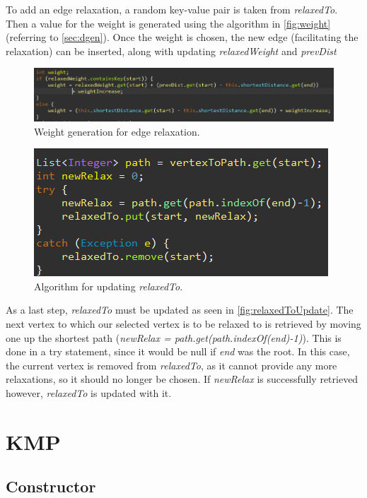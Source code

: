 \documentclass{l4proj}
\begin{document}
To add an edge relaxation, a random key-value pair is taken from \emph{relaxedTo}. Then a value for the weight is generated using the algorithm in \autoref{fig:weight} (referring to \autoref{sec:dgen}). Once the weight is chosen, the new edge (facilitating the relaxation) can be inserted, along with updating \emph{relaxedWeight} and \emph{prevDist}

\begin{figure}
    \centering
    \includegraphics[width=0.99\linewidth]{images/weight.png}    

    \caption{Weight generation for edge relaxation.}
    \label{fig:weight} 
\end{figure}

\begin{figure}
    \centering
    \includegraphics[width=0.5\linewidth]{images/relaxedToUpdate.png}    

    \caption{Algorithm for updating \emph{relaxedTo}.}
    \label{fig:relaxedToUpdate} 
\end{figure}

As a last step, \emph{relaxedTo} must be updated as seen in \autoref{fig:relaxedToUpdate}. The next vertex to which our selected vertex is to be relaxed to is retrieved by moving one up the shortest path (\emph{newRelax = path.get(path.indexOf(end)-1)}). This is done in a try statement, since it would be null if \emph{end} was the root. In this case, the current vertex is removed from \emph{relaxedTo}, as it cannot provide any more relaxations, so it should no longer be chosen. If \emph{newRelax} is successfully retrieved however, \emph{relaxedTo} is updated with it.

\section{KMP}

\subsection{Constructor}
\end{document}
